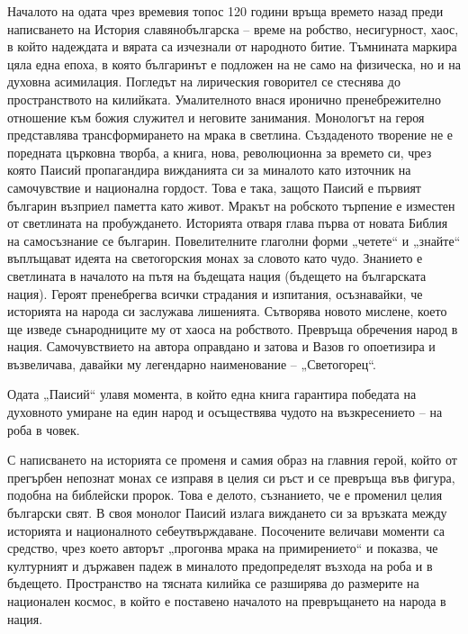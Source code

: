 \documentclass[12pt,a4paper]{article}
\begin{document}
\indent Началото на одата чрез времевия топос 120 години връща времето назад преди написването на История славянобългарска – време на робство, несигурност, хаос, в който надеждата и вярата са изчезнали от народното битие. Тъмнината маркира цяла една епоха, в която българинът е подложен на не само на физическа, но и на духовна асимилация. Погледът на лирическия говорител се стеснява до пространството на килийката. Умалителното внася иронично пренебрежително отношение към божия служител и неговите занимания. Монологът на героя представлява трансформирането на мрака в светлина. Създаденото творение не е поредната църковна творба, а книга, нова, революционна за времето си, чрез която Паисий пропагандира вижданията си за миналото като източник на самочувствие и национална гордост. Това е така, защото Паисий е първият българин възприел паметта като живот. Мракът на робското търпение е изместен от светлината на пробуждането. Историята отваря глава първа от новата Библия на самосъзнание се българин. Повелителните глаголни форми „четете“ и „знайте“ въплъщават идеята на светогорския монах за словото като чудо. Знанието е светлината в началото на пътя на бъдещата нация (бъдещето на българската нация). Героят пренебрегва всички страдания и изпитания, осъзнавайки, че историята на народа си заслужава лишенията. Сътворява новото мислене, което ще изведе сънародниците му от хаоса на робството. Превръща обречения народ в нация. Самочувствието на автора оправдано и затова и Вазов го опоетизира и възвеличава, давайки му легендарно наименование – „Светогорец“.
\vspace{0.1cm}
 
\indent Одата „Паисий“ улавя момента, в който една книга гарантира победата на духовното умиране на един народ и осъществява чудото на възкресението – на роба в човек.
\vspace{0.1cm}
 
\indent С написването на историята се променя и самия образ на главния герой, който от прегърбен непознат монах се изправя в целия си ръст и се превръща във фигура, подобна на библейски пророк. Това е делото, съзнанието, че е променил целия български свят. В своя монолог Паисий излага виждането си за връзката между историята и националното себеутвърждаване. Посочените величави моменти са средство, чрез което авторът „прогонва мрака на примирението“ и показва, че културният и държавен падеж в миналото предопределят възхода на роба и в бъдещето. Пространство на тясната килийка се разширява до размерите на национален космос, в който е поставено началото на превръщането на народа в нация.
\vspace{0.1cm}
 
\end{document}

